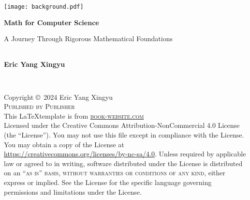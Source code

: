 \documentclass[
	12pt, %
	fleqn, %
	a4paper, %
]{LegrandOrangeBook}
\theoremstyle{lemmastyle}
\theoremstyle{solutionStyle}
\begin{document}

\titlepage %
	{\texttt{[image: background.pdf]}} %
	{ %
		\centering\sffamily %
		{\Huge\bfseries Math for Computer Science\par} %
		\vspace{16pt} %
		{\LARGE A Journey Through Rigorous Mathematical Foundations} %
		\vspace{24pt} %
		{\huge\bfseries \\ Eric Yang Xingyu\par} %
	}


\thispagestyle{empty} %

~\vfill %

\noindent Copyright \copyright\ 2024 Eric Yang Xingyu\\ %

\noindent \textsc{Published by Publisher}\\ %
This \LaTeX \space template is from 
\noindent \textsc{\href{https://www.latextemplates.com/template/legrand-orange-book}{book-website.com}}\\ %

\noindent Licensed under the Creative Commons Attribution-NonCommercial 4.0 License (the ``License''). You may not use this file except in compliance with the License. You may obtain a copy of the License at \url{https://creativecommons.org/licenses/by-nc-sa/4.0}. Unless required by applicable law or agreed to in writing, software distributed under the License is distributed on an \textsc{``as is'' basis, without warranties or conditions of any kind}, either express or implied. See the License for the specific language governing permissions and limitations under the License.\\ %
\end{document}
